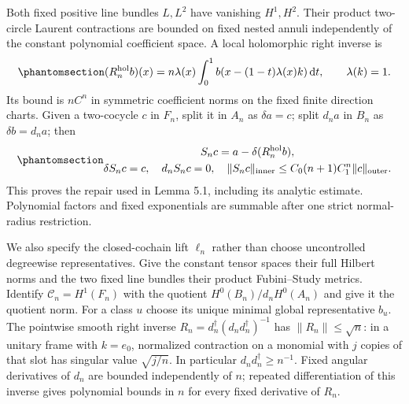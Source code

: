 \documentclass[
  english,
  11pt,
  reqno]{amsart}
\begin{document}
Both fixed positive line bundles \(L,L^2\) have vanishing \(H^1,H^2\).
Their product two-circle Laurent contractions are bounded on fixed
nested annuli independently of the constant polynomial coefficient
space. A local holomorphic right inverse is
\begin{equation}\protect\phantomsection\label{eq:gg-contact-holomorphic-right-inverse}{
 (R_n^{\mathrm{hol}}b)(x)
   =n\lambda(x)\int_0^1
        b(x-(1-t)\lambda(x)k)\,\mathrm dt,\qquad \lambda(k)=1 .
}\end{equation} Its bound is \(nC^n\) in symmetric coefficient norms on
the fixed finite direction charts. Given a two-cocycle \(c\) in \(F_n\),
split it in \(A_n\) as \(\delta a=c\); split \(d_na\) in \(B_n\) as
\(\delta b=d_na\); then
\begin{equation}\protect\phantomsection\label{eq:gg-contact-fixed-repair-bound}{\begin{gathered}
S_nc=a-\delta(R_n^{\mathrm{hol}}b), \\
\delta S_nc=c,\quad d_nS_nc=0,\quad
 \|S_nc\|_{\mathrm{inner}}
       \le C_0(n+1)C_1^n\|c\|_{\mathrm{outer}}.
\end{gathered}}\end{equation} This proves the repair used in Lemma 5.1, including its
analytic estimate. Polynomial factors and fixed exponentials are
summable after one strict normal-radius restriction.

We also specify the closed-cochain lift \(\ell_n\) rather than choose
uncontrolled degreewise representatives. Give the constant tensor spaces
their full Hilbert norms and the two fixed line bundles their product
Fubini--Study metrics. Identify \(\mathscr C_n=H^1(F_n)\) with the
quotient \(H^0(B_n)/d_nH^0(A_n)\) and give it the quotient norm. For a
class \(u\) choose its unique minimal global representative \(b_u\). The
pointwise smooth right inverse \(R_n=d_n^\dagger(d_nd_n^\dagger)^{-1}\)
has \(\|R_n\|\le\sqrt n\): in a unitary frame with \(k=e_0\), normalized
contraction on a monomial with \(j\) copies of that slot has singular
value \(\sqrt{j/n}\). In particular \(d_nd_n^\dagger\ge n^{-1}\). Fixed
angular derivatives of \(d_n\) are bounded independently of \(n\);
repeated differentiation of this inverse gives polynomial bounds in
\(n\) for every fixed derivative of \(R_n\).
\end{document}
